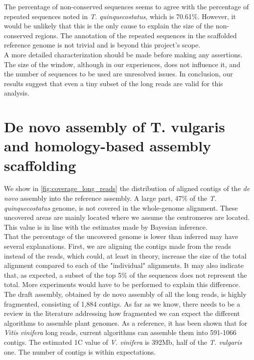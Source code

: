The percentage of non-conserved sequences seems to agree with the percentage of repeated sequences noted in \textit{T. quinquecostatus}, which is 70.61\%\cite{sunChromosomelevelAssemblyAnalysis2022}. However, it would be unlikely that this is the only cause to explain the size of the non-conserved regions. The annotation of the repeated sequences in the scaffolded reference genome is not trivial and is beyond this project's scope. \\

A more detailed characterization should be made before making any assertions. The size of the window, although in our experiences, does not influence it, and the number of sequences to be used are unresolved issues. In conclusion, our results suggest that even a tiny subset of the long reads are valid for this analysis.

\section{De novo assembly of T. vulgaris and homology-based assembly scaffolding}

We show in \autoref{fig:coverage_long_reads} the distribution of aligned contigs of the \textit{de novo} assembly into the reference assembly.  A large part, 47\% of the \textit{T. quinquecostatus} genome, is not covered in the whole-genome alignment. These uncovered areas are mainly located where we assume the centromeres are located. This value is in line with the estimates made by Bayesian inference.\\

That the percentage of the uncovered genome is lower than inferred may have several explanations. First, we are aligning the contigs made from the reads instead of the reads, which could, at least in theory,  increase the size of the total alignment compared to each of the "individual" alignments. It may also indicate that, as expected, a subset of the top 5\% of the sequences does not represent the total.  More experiments would have to be performed to explain this difference.\\

The draft assembly, obtained by de novo assembly of all the long reads, is highly fragmented, consisting of 1,884 contigs. As far as we know, there needs to be a review in the literature addressing how fragmented we can expect the different algorithms to assemble plant genomes. As a reference, it has been shown that for \textit{Vitis vinifera} long reads, current algorithms can assemble them into 591-1066 contigs. The estimated 1C value of \textit{V. vinifera} is 392Mb, half of the \textit{T. vulgaris} one. The number of contigs is within expectations.\\

